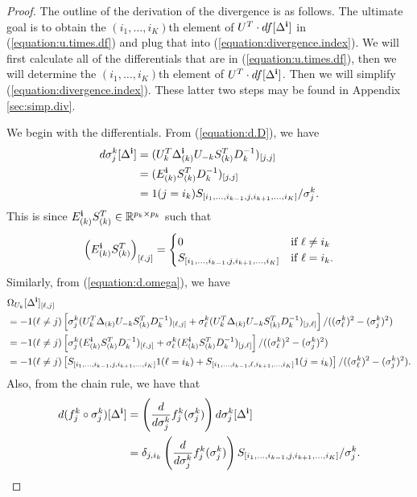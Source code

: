 \begin{proof}
The outline of the derivation of the divergence is as follows. The ultimate goal is to obtain the $(i_1,\ldots,i_K)$th element of $U^T \cdot df[\Delta^{\bf i}]$ in (\ref{equation:u.times.df}) and plug that into (\ref{equation:divergence.index}). We will first calculate all of the differentials that are in (\ref{equation:u.times.df}), then we will determine the $(i_1,\ldots,i_K)$th element of $U^T \cdot df[\Delta^{\bf i}]$. Then we will simplify (\ref{equation:divergence.index}). These latter two steps may be found in Appendix \ref{sec:simp.div}.

We begin with the differentials. From (\ref{equation:d.D}), we have
\begin{align}
d\sigma_j^k[\Delta^{\bf i}] &= (U_k^T \Delta_{(k)}^{\bf i} U_{-k} S_{(k)}^T D_k^{-1})_{[j,j]} \nonumber\\
&= (E^{\bf i}_{(k)} S_{(k)}^T D_k^{-1})_{[j,j]}\nonumber\\
\label{equation:d.sigma.i}
&= 1(j = i_k)S_{[i_1,\ldots,i_{k-1},j,i_{k+1},\ldots,i_K]}/\sigma_j^k.
\end{align}
This is since $E_{(k)}^{\bf i}S_{(k)}^T \in \mathbb{R}^{p_k\times p_k}$ such that
\begin{align}
\left(E_{(k)}^{\bf i}S_{(k)}^T\right)_{[\ell,j]} = \label{equation:Ek.Sk}
\begin{cases}
0 &\text{if } \ell \neq i_k\\
S_{[i_1,\ldots,i_{k-1},j,i_{k+1},\ldots,i_K]} &\text{if } \ell = i_k.
\end{cases}
\end{align}
Similarly, from (\ref{equation:d.omega}), we have
\begin{align}
&\Omega_{U_k}[\Delta^{\bf i}]_{[\ell, j]} \nonumber\\
&= -1(\ell\neq j)\left[\sigma_j^k(U_k^T\Delta_{(k)}U_{-k}S_{(k)}^TD_k^{-1})_{[\ell,j]} + \sigma_{\ell}^k(U_k^T\Delta_{(k)}U_{-k}S_{(k)}^TD_k^{-1})_{[j,\ell]}\right]/((\sigma_{\ell}^k)^2 - (\sigma_j^k)^2)\nonumber\\
&= -1(\ell\neq j)\left[\sigma_j^k(E^{\bf i}_{(k)}S_{(k)}^TD_k^{-1})_{[\ell,j]} + \sigma_{\ell}^k(E^{\bf i}_{(k)}S_{(k)}^TD_k^{-1})_{[j,\ell]}\right]/ ((\sigma_{\ell}^k)^2 - (\sigma_j^k)^2)\nonumber\\
\label{equation:d.omega.i}
&= -1(\ell\neq j)\left[S_{[i_1,\ldots,i_{k-1},j,i_{k+1},\ldots,i_K]}1(\ell = i_k) + S_{[i_1,\ldots,i_{k-1},\ell,i_{k+1},\ldots,i_K]}1(j=i_k)\right]/((\sigma_{\ell}^k)^2 - (\sigma_j^k)^2).
\end{align}
Also, from the chain rule, we have that
\begin{align}
d(f^k_j \circ \sigma^k_j)[\Delta^{\bf i}] &= \left(\frac{d}{d\sigma_j^k}f_j^k(\sigma_j^k)\right)d\sigma_j^k[\Delta^{\bf i}]\nonumber\\
\label{equation:d.comp}
&= \delta_{j,i_k}\left(\frac{d}{d\sigma_j^k}f_j^k(\sigma_j^k)\right)S_{[i_1,\ldots,i_{k-1},j,i_{k+1},\ldots,i_K]}/\sigma_j^k.
\end{align}


\end{proof}
